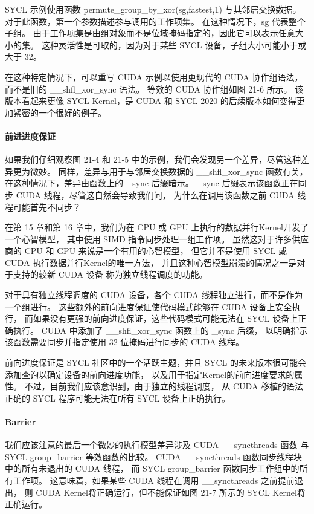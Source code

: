 SYCL 示例使用函数 permute\_group\_by\_xor(sg,fastest,1) 与其邻居交换数据。 
对于此函数，第一个参数描述参与调用的工作项集。 在这种情况下，sg 代表整个子组。 
由于工作项集是由组对象而不是位域掩码指定的，因此它可以表示任意大小的集。 
这种灵活性是可取的，因为对于某些 SYCL 设备，子组大小可能小于或大于 32。

在这种特定情况下，可以重写 CUDA 示例以使用更现代的 CUDA 协作组语法，
而不是旧的 \_\_shfl\_xor\_sync 语法。 等效的 CUDA 协作组如图 21-6 所示。 
该版本看起来更像 SYCL Kernel，是 CUDA 和 SYCL 2020 的后续版本如何变得更加紧密的一个很好的例子。

\paragraph{前进进度保证}

如果我们仔细观察图 21-4 和 21-5 中的示例，我们会发现另一个差异，尽管这种差异更为微妙。 
同样，差异与用于与邻居交换数据的 \_\_shfl\_xor\_sync 函数有关，
在这种情况下，差异由函数上的 \_sync 后缀暗示。 
\_sync 后缀表示该函数正在同步 CUDA 线程，尽管这自然会导致我们问，
为什么在调用该函数之前 CUDA 线程可能首先不同步？

在第 15 章和第 16 章中，我们为在 CPU 或 GPU 上执行的数据并行Kernel开发了一个心智模型，
其中使用 SIMD 指令同步处理一组工作项。 
虽然这对于许多供应商的 CPU 和 GPU 来说是一个有用的心智模型，
但它并不是使用 SYCL 或 CUDA 执行数据并行Kernel的唯一方法，
并且这种心智模型崩溃的情况之一是对于支持的较新 CUDA 设备 称为独立线程调度的功能。

对于具有独立线程调度的 CUDA 设备，各个 CUDA 线程独立进行，而不是作为一个组进行。 
这些额外的前向进度保证使代码模式能够在 CUDA 设备上安全执行，
而如果没有更强的前向进度保证，这些代码模式可能无法在 SYCL 设备上正确执行。 
CUDA 中添加了 \_\_shfl\_xor\_sync 函数上的 \_sync 后缀，
以明确指示该函数需要同步并指定使用 32 位掩码进行同步的 CUDA 线程。

前向进度保证是 SYCL 社区中的一个活跃主题，并且 SYCL 的未来版本很可能会添加查询以确定设备的前向进度功能，
以及用于指定Kernel的前向进度要求的属性。 不过，目前我们应该意识到，由于独立的线程调度，
从 CUDA 移植的语法正确的 SYCL 程序可能无法在所有 SYCL 设备上正确执行。

\paragraph{Barrier}

我们应该注意的最后一个微妙的执行模型差异涉及 CUDA \_\_syncthreads 函数
与 SYCL group\_barrier 等效函数的比较。 
CUDA \_\_syncthreads 函数同步线程块中的所有未退出的 CUDA 线程，
而 SYCL group\_barrier 函数同步工作组中的所有工作项。 
这意味着，如果某些 CUDA 线程在调用 \_\_syncthreads 之前提前退出，
则 CUDA Kernel将正确运行，但不能保证如图 21-7 所示的 SYCL Kernel将正确运行。

